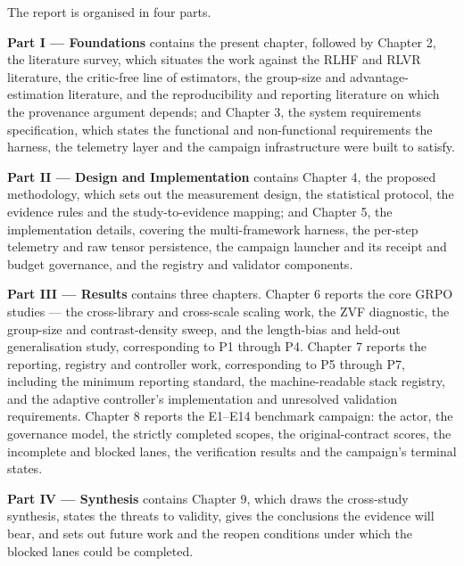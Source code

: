 \documentclass[12pt,a4paper]{report}
\begin{document}
The report is organised in four parts.

\textbf{Part I --- Foundations} contains the present chapter, followed
by Chapter 2, the literature survey, which situates the work against the
RLHF and RLVR literature, the critic-free line of estimators, the
group-size and advantage-estimation literature, and the reproducibility
and reporting literature on which the provenance argument depends; and
Chapter 3, the system requirements specification, which states the
functional and non-functional requirements the harness, the telemetry
layer and the campaign infrastructure were built to satisfy.

\textbf{Part II --- Design and Implementation} contains Chapter 4, the
proposed methodology, which sets out the measurement design, the
statistical protocol, the evidence rules and the study-to-evidence
mapping; and Chapter 5, the implementation details, covering the
multi-framework harness, the per-step telemetry and raw tensor
persistence, the campaign launcher and its receipt and budget
governance, and the registry and validator components.

\textbf{Part III --- Results} contains three chapters. Chapter 6 reports
the core GRPO studies --- the cross-library and cross-scale scaling
work, the ZVF diagnostic, the group-size and contrast-density sweep, and
the length-bias and held-out generalisation study, corresponding to P1
through P4. Chapter 7 reports the reporting, registry and controller
work, corresponding to P5 through P7, including the minimum reporting
standard, the machine-readable stack registry, and the adaptive
controller's implementation and unresolved validation requirements.
Chapter 8 reports the E1--E14 benchmark campaign: the actor, the
governance model, the strictly completed scopes, the original-contract
scores, the incomplete and blocked lanes, the verification results and
the campaign's terminal states.

\textbf{Part IV --- Synthesis} contains Chapter 9, which draws the
cross-study synthesis, states the threats to validity, gives the
conclusions the evidence will bear, and sets out future work and the
reopen conditions under which the blocked lanes could be completed.
\end{document}
